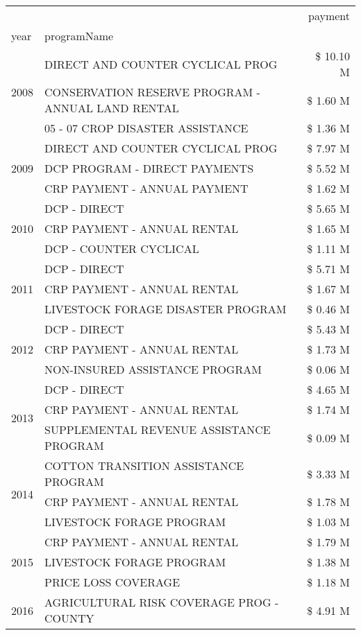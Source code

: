 \begin{tabular}{llr}
\toprule
 &  & payment \\
year & programName &  \\
\midrule
\multirow[t]{3}{*}{2008} & DIRECT AND COUNTER CYCLICAL PROG & \$ 10.10 M \\
 & CONSERVATION RESERVE PROGRAM - ANNUAL LAND RENTAL & \$ 1.60 M \\
 & 05 - 07 CROP DISASTER ASSISTANCE & \$ 1.36 M \\
\cline{1-3}
\multirow[t]{3}{*}{2009} & DIRECT AND COUNTER CYCLICAL PROG & \$ 7.97 M \\
 & DCP PROGRAM - DIRECT PAYMENTS & \$ 5.52 M \\
 & CRP PAYMENT - ANNUAL PAYMENT & \$ 1.62 M \\
\cline{1-3}
\multirow[t]{3}{*}{2010} & DCP - DIRECT & \$ 5.65 M \\
 & CRP PAYMENT - ANNUAL RENTAL & \$ 1.65 M \\
 & DCP - COUNTER CYCLICAL & \$ 1.11 M \\
\cline{1-3}
\multirow[t]{3}{*}{2011} & DCP - DIRECT & \$ 5.71 M \\
 & CRP PAYMENT - ANNUAL RENTAL & \$ 1.67 M \\
 & LIVESTOCK FORAGE DISASTER PROGRAM & \$ 0.46 M \\
\cline{1-3}
\multirow[t]{3}{*}{2012} & DCP - DIRECT & \$ 5.43 M \\
 & CRP PAYMENT - ANNUAL RENTAL & \$ 1.73 M \\
 & NON-INSURED ASSISTANCE PROGRAM & \$ 0.06 M \\
\cline{1-3}
\multirow[t]{3}{*}{2013} & DCP - DIRECT & \$ 4.65 M \\
 & CRP PAYMENT - ANNUAL RENTAL & \$ 1.74 M \\
 & SUPPLEMENTAL REVENUE ASSISTANCE PROGRAM & \$ 0.09 M \\
\cline{1-3}
\multirow[t]{3}{*}{2014} & COTTON TRANSITION ASSISTANCE PROGRAM & \$ 3.33 M \\
 & CRP PAYMENT - ANNUAL RENTAL & \$ 1.78 M \\
 & LIVESTOCK FORAGE PROGRAM & \$ 1.03 M \\
\cline{1-3}
\multirow[t]{3}{*}{2015} & CRP PAYMENT - ANNUAL RENTAL & \$ 1.79 M \\
 & LIVESTOCK FORAGE PROGRAM & \$ 1.38 M \\
 & PRICE LOSS COVERAGE & \$ 1.18 M \\
\cline{1-3}
\multirow[t]{3}{*}{2016} & AGRICULTURAL RISK COVERAGE PROG - COUNTY & \$ 4.91 M \\

\end{tabular}
